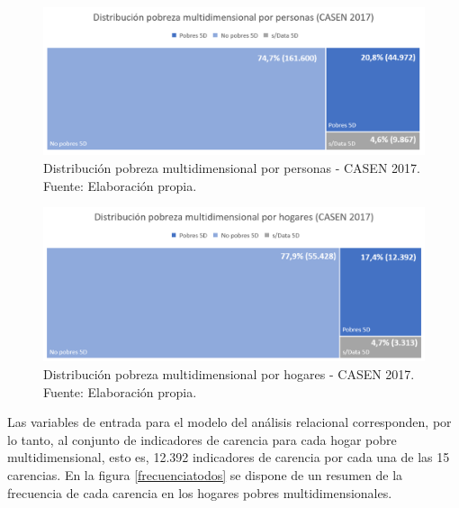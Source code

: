 \documentclass[12pt,letterpaper,spanish]{article}
\begin{document}
\begin{figure}[H]
    \centering
    \includegraphics[width=\textwidth]{Mati N/pobrezaXpersonas.png}
    \caption{Distribución pobreza multidimensional por personas - CASEN 2017. Fuente: Elaboración propia.}
    \label{pobresXpersona}
\end{figure}

\begin{figure}[H]
    \centering
    \includegraphics[width=\textwidth]{Mati N/pobrezaXhogares.png}
    \caption{Distribución pobreza multidimensional por hogares - CASEN 2017. Fuente: Elaboración propia.}
    \label{pobresXhogar}
\end{figure}
 

 
 Las variables de entrada para el modelo del análisis relacional corresponden, por lo tanto, al conjunto de indicadores de carencia para cada hogar pobre multidimensional, esto es, 12.392 indicadores de carencia por cada una de las 15 carencias. En la figura \ref{frecuenciatodos} se dispone de un resumen de la frecuencia de cada carencia en los hogares pobres multidimensionales. 
\end{document}
